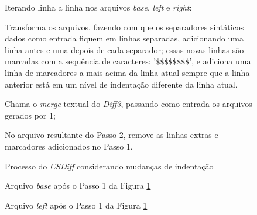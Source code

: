 \begin{figure}[ht]
	\begin{center}
		\begin{compactenum}[(1)]
			\item Iterando linha a linha nos arquivos \emph{base}, \emph{left} e \emph{right}:
			\begin{compactenum}
                \item Transforma os arquivos, fazendo com que os separadores
                    sintáticos dados como entrada fiquem em linhas separadas,
                    adicionando uma linha antes e uma depois de cada separador;
                    essas novas linhas são marcadas com a sequência de
                    caracteres: '\verb|$$$$$$$$|', e adiciona uma linha de
                    marcadores a mais acima da linha atual sempre que a linha
                    anterior está em um nível de indentação diferente da linha
                    atual.
			\end{compactenum}
            \item Chama o \emph{merge} textual do \emph{Diff3}, passando como
                entrada os arquivos gerados por 1;
            \item No arquivo resultante do Passo 2, remove as linhas extras e
                marcadores adicionados no Passo 1.
		\end{compactenum}
	\end{center}
	\caption{Processo do \emph{CSDiff} considerando mudanças de indentação}\label{csdiff_process_indentation}
\end{figure}

\begin{figure}[ht]
	\begin{center}
		
		\caption{Arquivo \emph{base} após o Passo 1 da Figura
			\ref{csdiff_process_indentation}}\label{base_marcadores_indentacao}
	\end{center}
\end{figure}

\begin{figure}[ht]
	\begin{center}
		
		\caption{Arquivo \emph{left} após o Passo 1 da Figura
			\ref{csdiff_process_indentation}}\label{left_marcadores_indentacao}
	\end{center}
\end{figure}

